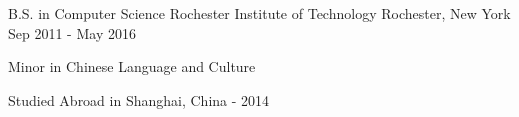 
\begin{cventries}

  \cventry
    {B.S. in Computer Science}
    {Rochester Institute of Technology}
    {Rochester, New York}
    {Sep 2011 - May 2016}
    {
      \begin{cvitems}
        \item {Minor in Chinese Language and Culture}
        \item {Studied Abroad in Shanghai, China - 2014 }
      \end{cvitems}
    }

\end{cventries}
